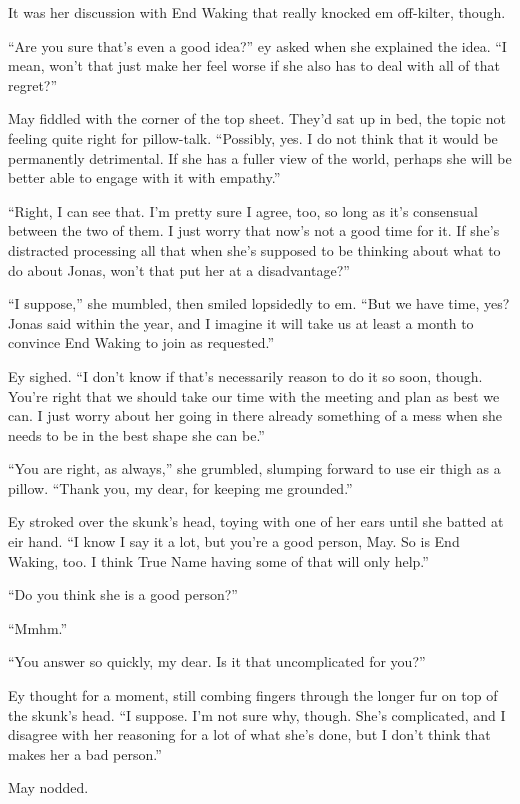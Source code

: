 It was her discussion with End Waking that really knocked em off-kilter, though.

``Are you sure that's even a good idea?'' ey asked when she explained the idea. ``I mean, won't that just make her feel worse if she also has to deal with all of that regret?''

May fiddled with the corner of the top sheet. They'd sat up in bed, the topic not feeling quite right for pillow-talk. ``Possibly, yes. I do not think that it would be permanently detrimental. If she has a fuller view of the world, perhaps she will be better able to engage with it with empathy.''

``Right, I can see that. I'm pretty sure I agree, too, so long as it's consensual between the two of them. I just worry that now's not a good time for it. If she's distracted processing all that when she's supposed to be thinking about what to do about Jonas, won't that put her at a disadvantage?''

``I suppose,'' she mumbled, then smiled lopsidedly to em. ``But we have time, yes? Jonas said within the year, and I imagine it will take us at least a month to convince End Waking to join as requested.''

Ey sighed. ``I don't know if that's necessarily reason to do it so soon, though. You're right that we should take our time with the meeting and plan as best we can. I just worry about her going in there already something of a mess when she needs to be in the best shape she can be.''

``You are right, as always,'' she grumbled, slumping forward to use eir thigh as a pillow. ``Thank you, my dear, for keeping me grounded.''

Ey stroked over the skunk's head, toying with one of her ears until she batted at eir hand. ``I know I say it a lot, but you're a good person, May. So is End Waking, too. I think True Name having some of that will only help.''

``Do you think she is a good person?''

``Mmhm.''

``You answer so quickly, my dear. Is it that uncomplicated for you?''

Ey thought for a moment, still combing fingers through the longer fur on top of the skunk's head. ``I suppose. I'm not sure why, though. She's complicated, and I disagree with her reasoning for a lot of what she's done, but I don't think that makes her a bad person.''

May nodded.


